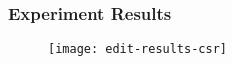 \begin{frame}
  \frametitle{Experiment Results}
  \begin{figure}
    \centering
    \texttt{[image: edit-results-csr]}
  \end{figure}
\end{frame}
